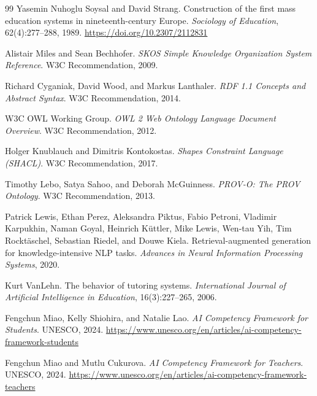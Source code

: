 \documentclass[11pt,letterpaper]{article}
\begin{document}
\begin{thebibliography}{99}
Yasemin Nuhoglu Soysal and David Strang.
\newblock Construction of the first mass education systems in nineteenth-century Europe.
\newblock \emph{Sociology of Education}, 62(4):277--288, 1989.
\newblock \href{https://doi.org/10.2307/2112831}{https://doi.org/10.2307/2112831}

Alistair Miles and Sean Bechhofer.
\newblock \emph{SKOS Simple Knowledge Organization System Reference}.
\newblock W3C Recommendation, 2009.

Richard Cyganiak, David Wood, and Markus Lanthaler.
\newblock \emph{RDF 1.1 Concepts and Abstract Syntax}.
\newblock W3C Recommendation, 2014.

W3C OWL Working Group.
\newblock \emph{OWL 2 Web Ontology Language Document Overview}.
\newblock W3C Recommendation, 2012.

Holger Knublauch and Dimitris Kontokostas.
\newblock \emph{Shapes Constraint Language (SHACL)}.
\newblock W3C Recommendation, 2017.

Timothy Lebo, Satya Sahoo, and Deborah McGuinness.
\newblock \emph{PROV-O: The PROV Ontology}.
\newblock W3C Recommendation, 2013.

Patrick Lewis, Ethan Perez, Aleksandra Piktus, Fabio Petroni, Vladimir Karpukhin, Naman Goyal, Heinrich K\"uttler, Mike Lewis, Wen-tau Yih, Tim Rockt\"aschel, Sebastian Riedel, and Douwe Kiela.
\newblock Retrieval-augmented generation for knowledge-intensive NLP tasks.
\newblock \emph{Advances in Neural Information Processing Systems}, 2020.

Kurt VanLehn.
\newblock The behavior of tutoring systems.
\newblock \emph{International Journal of Artificial Intelligence in Education}, 16(3):227--265, 2006.

Fengchun Miao, Kelly Shiohira, and Natalie Lao.
\newblock \emph{AI Competency Framework for Students}.
\newblock UNESCO, 2024.
\newblock \href{https://www.unesco.org/en/articles/ai-competency-framework-students}{https://www.unesco.org/en/articles/ai-competency-framework-students}

Fengchun Miao and Mutlu Cukurova.
\newblock \emph{AI Competency Framework for Teachers}.
\newblock UNESCO, 2024.
\newblock \href{https://www.unesco.org/en/articles/ai-competency-framework-teachers}{https://www.unesco.org/en/articles/ai-competency-framework-teachers}


\end{thebibliography}
\end{document}
